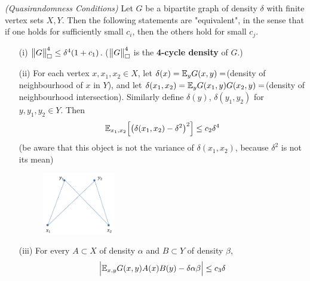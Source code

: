 \documentclass[10pt,a4paper]{report}
\begin{document}
 \emph{(Quasirandomness Conditions)} Let $G$ be a bipartite graph of density $\delta$ with finite vertex sets $X,Y$. Then the following statements are "equivalent", in the sense that if one holds for sufficiently small $c_i$, then the others hold for small $c_j$.
\begin{itemize}
\item[(i)] $\bigl\lVert G\bigr\rVert_{\tiny{\square}}^4 \leq \delta^4 (1+c_1)$. ($\bigl\lVert G\bigr\rVert_{\tiny{\square}}^4$ is the \textbf{4-cycle density} of $G$.)
\item[(ii)] For each vertex $x,x_1, x_2 \in X$, let $\delta(x) = \mathbb{E}_y G(x,y) =$(density of neighbourhood of $x$ in $Y$), and let $\delta(x_1,x_2) = \mathbb{E}_y G(x_1,y)G(x_2,y)=$(density of neighbourhood intersection). Similarly define $\delta(y)$, $\delta(y_1,y_2)$ for $y,y_1,y_2 \in Y$. Then
\begin{align*}
\mathbb{E}_{x_1,x_2} \Big[ \big( \delta(x_1,x_2) - \delta^2 \big)^2 \Big] \leq c_2 \delta^4
\end{align*}
(be aware that this object is not the variance of $\delta(x_1,x_2)$, because $\delta^2$ is not its mean)
\begin{figure}[h]
	\centering
	\includegraphics[width=0.3\textwidth]{2}
\end{figure}
\item[(iii)] For every $A \subset X$ of density $\alpha$ and $B\subset Y$ of density $\beta$,
\begin{align*}
\Big| \mathbb{E}_{x,y} G(x,y) A(x)B(y) - \delta \alpha \beta \Big| \leq c_3 \delta
\end{align*}
\end{itemize}
\end{document}
